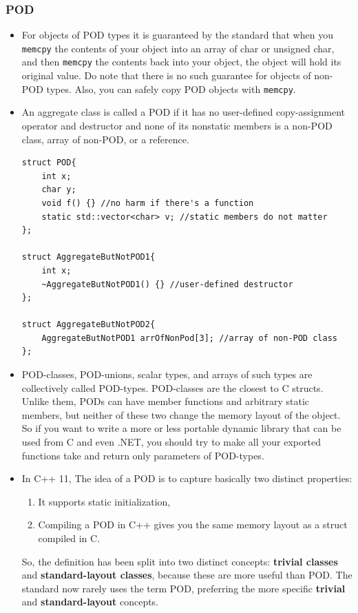 \documentclass[a4paper,11pt,twoside]{book}
\begin{document}
\subsubsection{POD}
\begin{itemize}
	
	\item For objects of POD types it is guaranteed by the standard that when you \texttt{memcpy} the contents of your object into an array of char or unsigned char, and then \texttt{memcpy} the contents back into your object, the object will hold its original value. Do note that there is no such guarantee for objects of non-POD types. Also, you can safely copy POD objects with \texttt{memcpy}.
	
	\item An aggregate class is called a POD if it has no user-defined copy-assignment operator and destructor and none of its nonstatic members is a non-POD class, array of non-POD, or a reference.
	
\begin{lstlisting}[numbers=none]
struct POD{
	int x;
	char y;
	void f() {} //no harm if there's a function
	static std::vector<char> v; //static members do not matter
};
	
struct AggregateButNotPOD1{
	int x;
	~AggregateButNotPOD1() {} //user-defined destructor
};
	
struct AggregateButNotPOD2{
	AggregateButNotPOD1 arrOfNonPod[3]; //array of non-POD class
};
\end{lstlisting}
	
	
	\item POD-classes, POD-unions, scalar types, and arrays of such types are collectively called POD-types. POD-classes are the closest to C structs. Unlike them, PODs can have member functions and arbitrary static members, but neither of these two change the memory layout of the object. So if you want to write a more or less portable dynamic library that can be used from C and even .NET, you should try to make all your exported functions take and return only parameters of POD-types.
		
	
	\item In C++ 11, The idea of a POD is to capture basically two distinct properties:
	\begin{enumerate}
		\item It supports static initialization,
		\item Compiling a POD in C++ gives you the same memory layout as a struct compiled in C.
	\end{enumerate}
	
	So, the definition has been split into two distinct concepts: \textbf{trivial classes} and \textbf{standard-layout classes}, because these are more useful than POD. The standard now rarely uses the term POD, preferring the more specific \textbf{trivial} and \textbf{standard-layout} concepts.
\end{itemize}
\end{document}
